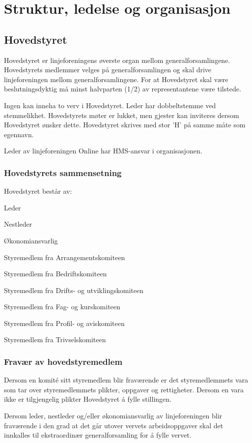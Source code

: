 \chapter{Struktur, ledelse og organisasjon}
\section{Hovedstyret}
\vspace{23pt}

Hovedstyret er linjeforeningens øverste organ mellom generalforsamlingene. Hovedstyrets medlemmer velges på generalforsamlingen og skal drive linjeforeningen mellom generalforsamlingene. For at Hovedstyret skal være beslutningsdyktig må minst halvparten (1/2) av representantene være tilstede.\newline

Ingen kan inneha to verv i Hovedstyret. Leder har dobbeltstemme ved stemmelikhet. Hovedstyrets møter er lukket, men gjester kan inviteres dersom Hovedstyret ønsker dette. Hovedstyret skrives med stor ’H’ på samme måte som egennavn.

Leder av linjeforeningen Online har HMS-ansvar i organisasjonen.


\subsection{Hovedstyrets sammensetning}{
Hovedstyret består av:
\begin{liste}
	\item Leder
	\item Nestleder
	\item Økonomiansvarlig
	\item Styremedlem fra Arrangementskomiteen
	\item Styremedlem fra Bedriftskomiteen
	\item Styremedlem fra Drifts- og utviklingskomiteen
	\item Styremedlem fra Fag- og kurskomiteen
	\item Styremedlem fra Profil- og aviskomiteen
	\item Styremedlem fra Trivselskomiteen
\end{liste}
}


\subsection{Fravær av hovedstyremedlem}{
Dersom en komité sitt styremedlem blir fraværende er det styremedlemmets vara som tar over styremedlemmets plikter, oppgaver og rettigheter. Dersom en vara ikke er tilgjengelig plikter Hovedstyret å fylle stillingen.

Dersom leder, nestleder og/eller økonomiansvarlig av linjeforeningen blir fraværende i den grad at det går utover vervets arbeidsoppgaver skal det innkalles til ekstraordinær generalforsamling for å fylle vervet.
}
